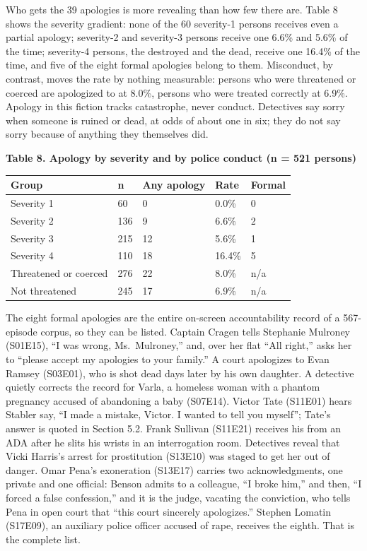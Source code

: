 \documentclass[
]{article}
\newcounter{none} %
\begin{document}
Who gets the 39 apologies is more revealing than how few there are.
Table 8 shows the severity gradient: none of the 60 severity-1 persons
receives even a partial apology; severity-2 and severity-3 persons
receive one 6.6\% and 5.6\% of the time; severity-4 persons, the
destroyed and the dead, receive one 16.4\% of the time, and five of the
eight formal apologies belong to them. Misconduct, by contrast, moves
the rate by nothing measurable: persons who were threatened or coerced
are apologized to at 8.0\%, persons who were treated correctly at 6.9\%.
Apology in this fiction tracks catastrophe, never conduct. Detectives
say sorry when someone is ruined or dead, at odds of about one in six;
they do not say sorry because of anything they themselves did.

\textbf{Table 8. Apology by severity and by police conduct (n = 521
persons)}

{\def\LTcaptype{none} %
\begin{longtable}[]{@{}lllll@{}}
\toprule\noalign{}
Group & n & Any apology & Rate & Formal \\
\midrule\noalign{}
\endhead
\bottomrule\noalign{}
\endlastfoot
Severity 1 & 60 & 0 & 0.0\% & 0 \\
Severity 2 & 136 & 9 & 6.6\% & 2 \\
Severity 3 & 215 & 12 & 5.6\% & 1 \\
Severity 4 & 110 & 18 & 16.4\% & 5 \\
Threatened or coerced & 276 & 22 & 8.0\% & n/a \\
Not threatened & 245 & 17 & 6.9\% & n/a \\
\end{longtable}
}

The eight formal apologies are the entire on-screen accountability
record of a 567-episode corpus, so they can be listed. Captain Cragen
tells Stephanie Mulroney (S01E15), ``I was wrong, Ms.~Mulroney,'' and,
over her flat ``All right,'' asks her to ``please accept my apologies to
your family.'' A court apologizes to Evan Ramsey (S03E01), who is shot
dead days later by his own daughter. A detective quietly corrects the
record for Varla, a homeless woman with a phantom pregnancy accused of
abandoning a baby (S07E14). Victor Tate (S11E01) hears Stabler say, ``I
made a mistake, Victor. I wanted to tell you myself''; Tate's answer is
quoted in Section 5.2. Frank Sullivan (S11E21) receives his from an ADA
after he slits his wrists in an interrogation room. Detectives reveal
that Vicki Harris's arrest for prostitution (S13E10) was staged to get
her out of danger. Omar Pena's exoneration (S13E17) carries two
acknowledgments, one private and one official: Benson admits to a
colleague, ``I broke him,'' and then, ``I forced a false confession,''
and it is the judge, vacating the conviction, who tells Pena in open
court that ``this court sincerely apologizes.'' Stephen Lomatin
(S17E09), an auxiliary police officer accused of rape, receives the
eighth. That is the complete list.
\end{document}
